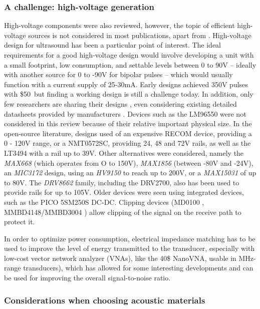 \documentclass{article}
\begin{document}
\subsubsection{A challenge: high-voltage generation}

High-voltage components were also reviewed, however, the topic of efficient high-voltage sources is not considered in most publications, apart from \cite{xiao_design_2013}. High-voltage design for ultrasound has been a particular point of interest. The ideal requirements for a good high-voltage design would involve developing a unit with a small footprint, low consumption, and settable levels between 0 to 90V -- ideally with another source for 0 to -90V for bipolar pulses -- which would usually function with a current supply of 25-30mA.  Early designs \cite{brown_low-cost_2002} achieved 350V pulses with \$50\, but finding a working design is still a challenge today. In addition, only few researchers are sharing their designs \cite{tang_computerized_2014}, even considering existing detailed datasheets provided by manufacturers \cite{granata_designing_2020}. Devices such as the LM96550 were not considered in this review because of their relative important physical size. In the open-source literature, designs  used of an expensive RECOM device, providing a 0 - 120V range, or a NMT0572SC, providing 24, 48 and 72V rails, as well as the LT3494 with a rail up to 39V. Other alternatives were considered, namely the \emph{MAX668} (which operates from O to 150V), \emph{MAX1856} (between -80V and -24V), an \emph{MIC3172} design, using an \emph{HV9150} to reach up to 200V, or a \emph{MAX15031} of up to 80V. The \emph{DRV8662} family, including the DRV2700, also has been used to provide rails for up to 105V. Older devices were seen using integrated devices, such as the PICO 5SM250S DC-DC. Clipping devices (MD0100 \cite{li_new_2014, sharma_development_2015}, MMBD4148/MMBD3004 \cite{ching_chu_designing_nodate}) allow clipping of the signal on the receive path to protect it.

In order to optimize power consumption, electrical impedance matching \cite{rathod_review_2019} has to be used to improve the level of energy transmitted to the transducer, especially with low-cost vector network analyzer (VNAs), like the 40\$ NanoVNA, usable in MHz-range transducers), which has allowed for some interesting developments \cite{garcia-rodriguez_low_2010, wei_design_2020} and can be used for improving the overall signal-to-noise ratio.

\subsubsection{Considerations when choosing acoustic  materials}
\end{document}
